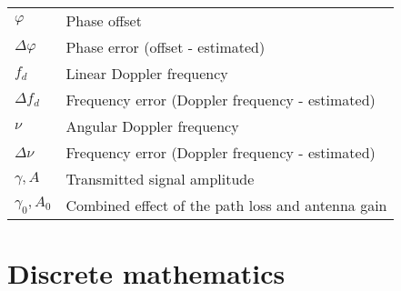 \documentclass{article}
\begin{document}
\begin{xltabular}{\textwidth}{XX}
    \(\varphi\) & Phase offset \\
    \(\Delta\varphi\) & Phase error (offset - estimated) \\
    \(f_d\) & Linear Doppler frequency\\
    \(\Delta f_d\) & Frequency error (Doppler frequency - estimated)\\
    \(\nu\) & Angular Doppler frequency\\
    \(\Delta \nu\) & Frequency error (Doppler frequency - estimated)\\
    \(\gamma, A\) & Transmitted signal amplitude\\
    \(\gamma_0, A_0\) & Combined effect of the path loss and antenna gain
\end{xltabular}

\section{Discrete mathematics}
\end{document}
